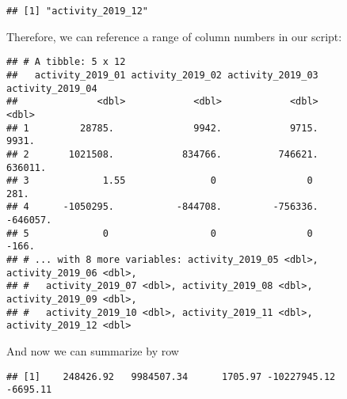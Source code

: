 \documentclass[
]{book}
\newenvironment{Shaded}{\begin{snugshade}}{\end{snugshade}}
\newcommand{\CommentTok}[1]{\textcolor[rgb]{0.56,0.35,0.01}{\textit{#1}}}
\newcommand{\DecValTok}[1]{\textcolor[rgb]{0.00,0.00,0.81}{#1}}
\newcommand{\KeywordTok}[1]{\textcolor[rgb]{0.13,0.29,0.53}{\textbf{#1}}}
\newcommand{\NormalTok}[1]{#1}
\newcommand{\OperatorTok}[1]{\textcolor[rgb]{0.81,0.36,0.00}{\textbf{#1}}}
\newcommand{\StringTok}[1]{\textcolor[rgb]{0.31,0.60,0.02}{#1}}
\begin{document}
\begin{verbatim}
## [1] "activity_2019_12"
\end{verbatim}

Therefore, we can reference a range of column numbers in our script:

\begin{Shaded}
\end{Shaded}

\begin{verbatim}
## # A tibble: 5 x 12
##   activity_2019_01 activity_2019_02 activity_2019_03 activity_2019_04
##              <dbl>            <dbl>            <dbl>            <dbl>
## 1         28785.              9942.            9715.            9931.
## 2       1021508.            834766.          746621.          636011.
## 3             1.55               0                0              281.
## 4      -1050295.           -844708.         -756336.         -646057.
## 5             0                  0                0             -166.
## # ... with 8 more variables: activity_2019_05 <dbl>, activity_2019_06 <dbl>,
## #   activity_2019_07 <dbl>, activity_2019_08 <dbl>, activity_2019_09 <dbl>,
## #   activity_2019_10 <dbl>, activity_2019_11 <dbl>, activity_2019_12 <dbl>
\end{verbatim}

And now we can summarize by row

\begin{Shaded}
\end{Shaded}

\begin{verbatim}
## [1]    248426.92   9984507.34      1705.97 -10227945.12     -6695.11
\end{verbatim}
\end{document}
